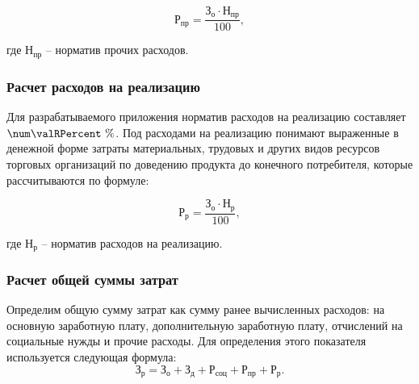 \begin{equation}
  \label{eq:econ:RPr}
  \text{Р}_\text{пр} = \frac{\text{З}_\text{о} \cdot \text{Н}_\text{пр}}
    {100},
\end{equation}
\begin{explanationx}
  \item[где] $ \text{Н}_\text{пр} $ -- норматив прочих расходов.
\end{explanationx}


\subsubsection{Расчет расходов на реализацию}


Для разрабатываемого приложения норматив расходов на реализацию составляет $ \num\valRPercent \ \% $.
Под расходами на реализацию понимают выраженные в денежной форме затраты материальных, трудовых и других видов ресурсов торговых организаций по доведению продукта до конечного потребителя, которые рассчитываются по формуле:

\begin{equation}
  \label{eq:econ:R}
  \text{Р}_\text{р} = \frac{\text{З}_\text{о} \cdot \text{Н}_\text{р}}
    {100},
\end{equation}
\begin{explanationx}
  \item[где] $ \text{Н}_\text{р} $ -- норматив расходов на реализацию.
\end{explanationx}


\subsubsection{Расчет общей суммы затрат}

Определим общую сумму затрат как сумму ранее вычисленных расходов: на основную
заработную плату, дополнительную заработную плату, отчислений на социальные нужды и
прочие расходы.
Для определения этого показателя используется следующая формула:
\fixTableSectionSpace
\begin{equation}
  \label{eq:econ:Zr}
  \text{З}_\text{р} = \text{З}_\text{о} + \text{З}_\text{д}
    + \text{Р}_\text{соц} + \text{Р}_\text{пр} + \text{Р}_\text{р}.
\end{equation}

